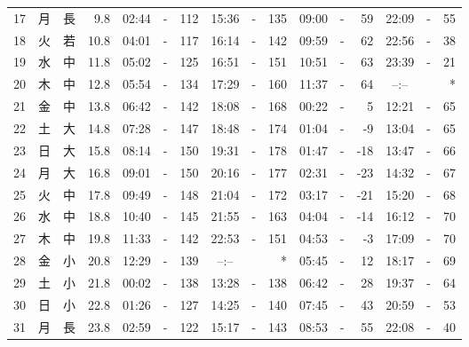 \documentclass[12pt.a4j]{jsarticle}
\begin{document}
\begin{center}
\begin{table}[ht]
\begin{tabular}{|rc|cr|ccrccr|ccrccr|}
17 & 月 & 長 &  9.8 & 02:44 &-& 112 & 15:36 &-& 135 & 09:00 &-&  59 & 22:09 &-&  55 \\
18 & 火 & 若 & 10.8 & 04:01 &-& 117 & 16:14 &-& 142 & 09:59 &-&  62 & 22:56 &-&  38 \\
19 & 水 & 中 & 11.8 & 05:02 &-& 125 & 16:51 &-& 151 & 10:51 &-&  63 & 23:39 &-&  21 \\
20 & 木 & 中 & 12.8 & 05:54 &-& 134 & 17:29 &-& 160 & 11:37 &-&  64 & --:-- & &  *  \\
21 & 金 & 中 & 13.8 & 06:42 &-& 142 & 18:08 &-& 168 & 00:22 &-&   5 & 12:21 &-&  65 \\
22 & 土 & 大 & 14.8 & 07:28 &-& 147 & 18:48 &-& 174 & 01:04 &-&  -9 & 13:04 &-&  65 \\
23 & 日 & 大 & 15.8 & 08:14 &-& 150 & 19:31 &-& 178 & 01:47 &-& -18 & 13:47 &-&  66 \\
24 & 月 & 大 & 16.8 & 09:01 &-& 150 & 20:16 &-& 177 & 02:31 &-& -23 & 14:32 &-&  67 \\
25 & 火 & 中 & 17.8 & 09:49 &-& 148 & 21:04 &-& 172 & 03:17 &-& -21 & 15:20 &-&  68 \\
26 & 水 & 中 & 18.8 & 10:40 &-& 145 & 21:55 &-& 163 & 04:04 &-& -14 & 16:12 &-&  70 \\
27 & 木 & 中 & 19.8 & 11:33 &-& 142 & 22:53 &-& 151 & 04:53 &-&  -3 & 17:09 &-&  70 \\
28 & 金 & 小 & 20.8 & 12:29 &-& 139 & --:-- & &  *  & 05:45 &-&  12 & 18:17 &-&  69 \\
29 & 土 & 小 & 21.8 & 00:02 &-& 138 & 13:28 &-& 138 & 06:42 &-&  28 & 19:37 &-&  64 \\
30 & 日 & 小 & 22.8 & 01:26 &-& 127 & 14:25 &-& 140 & 07:45 &-&  43 & 20:59 &-&  53 \\
31 & 月 & 長 & 23.8 & 02:59 &-& 122 & 15:17 &-& 143 & 08:53 &-&  55 & 22:08 &-&  40 \\
\hline
\end{tabular}
\end{table}
\newpage
\end{center}
\end{document}
